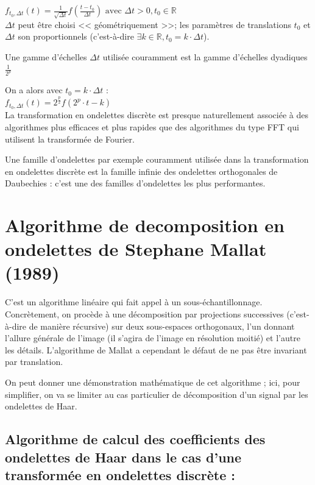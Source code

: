 \documentclass{article}
\begin{document}
$\displaystyle f_{t_{0},\Delta{}t}(t) = \frac{1}{\sqrt{\Delta{}t}}f(\frac{t-t_0}{\Delta{}t}) \text{ avec } \Delta{}t > 0, t_0 \in \mathbb{R}$ \\

$\Delta{}t$ peut être choisi << géométriquement >>; les paramètres de translations $t_0$ et $\Delta{}t$ son proportionnels (c'est-à-dire $\exists k \in \mathbb{R}, t_0 = k\cdot{}\Delta{}t$).

Une gamme d'échelles $\Delta{}t$ utilisée couramment est la gamme d'échelles dyadiques $\frac{1}{2^p}$

On a alors avec $t_0 = k\cdot\Delta{}t$ : \\

$\displaystyle f_{t_{0},\Delta{}t}(t) = 2^{\frac{p}{2}}f(2^{p}\cdot{}t - k)$ \\

La transformation en ondelettes discrète est presque naturellement associée à des algorithmes plus efficaces et plus rapides que des algorithmes du type FFT qui utilisent la transformée de Fourier.

Une famille d’ondelettes par exemple couramment utilisée dans la transformation en ondelettes discrète est la famille infinie des ondelettes orthogonales de Daubechies : c’est une des familles d’ondelettes les plus performantes.

\section{Algorithme de decomposition en ondelettes de Stephane Mallat (1989)}

C’est un algorithme linéaire qui fait appel à un sous-échantillonnage. Concrètement, on procède à une décomposition par projections successives (c’est-à-dire de manière récursive) sur deux sous-espaces orthogonaux, l’un donnant l’allure générale de l’image (il s'agira de l'image en résolution moitié) et l’autre les détails. 
L’algorithme de Mallat a cependant le défaut de ne pas être invariant par translation.

On peut donner une démonstration mathématique de cet algorithme ; ici, pour simplifier, on va se limiter au cas particulier de décomposition d’un signal par les ondelettes de Haar.


\subsection*{Algorithme de calcul des coefficients des ondelettes de Haar dans le cas d’une transformée en ondelettes discrète :}
\end{document}
